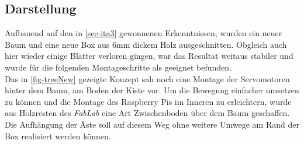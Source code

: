 \documentclass[.../Dokumentation.tex]{subfiles}
\begin{document}
\subsection{Darstellung}\label{sec-ita4-visualization}
Aufbauend auf den in \ref{sec-ita3} gewonnenen Erkenntnissen, wurden ein neuer 
Baum und eine neue Box aus 6mm dickem Holz ausgeschnitten. Obgleich auch hier 
wieder einige Blätter verloren gingen, war das Resultat weitaus stabiler und 
wurde für die folgenden Montageschritte als geeignet befunden.\\
Das in \ref{fig-treeNew} gezeigte Konzept sah noch eine Montage der 
Servomotoren hinter dem Baum, am Boden der Kiste vor. 
Um die Bewegung einfacher umsetzen zu können und die Montage des Raspberry 
Pis im Inneren zu erleichtern, wurde aus Holzresten des \textit{FabLab} eine 
Art Zwischenboden über dem Baum geschaffen. Die Aufhängung der Äste soll 
auf diesem Weg ohne weitere Umwege am Rand der Box realisiert werden können.
\end{document}
